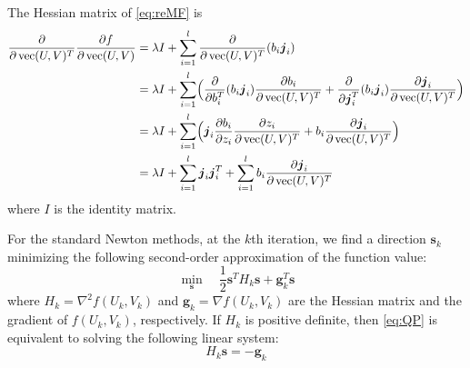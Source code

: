 \documentclass[11pt,twoside]{article}
\newcommand{\bsym}[1]{\ensuremath{\boldsymbol{#1}}}
\newcommand{\bj}{\ensuremath{\bsym{j}}}
\newcommand{\bs}{\ensuremath{\bsym{s}}}
\newcommand{\bg}{\ensuremath{\bsym{g}}}
\DeclareMathOperator*{\vectorize}{vec}
\begin{document}
The Hessian matrix of \eqref{eq:reMF} is 
\begin{align}
\pdv{\vectorize(U,V)^T} \frac{\partial f}{\partial \vectorize(U,V)}
&=\lambda I + \sum_{i=1}^{l}\pdv{\vectorize(U,V)^T} (b_i \bj_i)\nonumber\\
&=\lambda I + \sum_{i=1}^{l} \Bigl( \pdv{b_i^T} (b_i \bj_i) \frac{\partial b_i}{\partial \vectorize(U,V)^T} + \pdv{\bj_i^T} (b_i \bj_i) \frac{\partial \bj_i}{\partial \vectorize(U,V)^T} \Bigr)\nonumber\\
&=\lambda I + \sum_{i=1}^{l} \Bigl( \bj_i \frac{\partial b_i}{\partial z_i} \frac{\partial z_i}{\partial \vectorize(U,V)^T} + b_i \frac{\partial \bj_i}{\partial \vectorize(U,V)^T} \Bigr)\nonumber\\
&=\lambda I + \sum_{i=1}^{l} \bj_i \bj_i^T + \sum_{i=1}^{l} b_i \frac{\partial \bj_i}{\partial \vectorize(U,V)^T} 
\label{eq:H}
\end{align}
where $I$ is the identity matrix.

For the standard Newton methods, at the $k$th iteration, we find a direction $\bs_k$ minimizing the following second-order approximation of the function value:
\begin{equation}
    \min_{\bs} \quad \frac{1}{2}\bs^T H_k \bs + \bg_k^T \bs
\label{eq:QP}
\end{equation}
where $H_k = \nabla^2 f(U_k, V_k)$ and $\bg_k = \nabla f(U_k, V_k)$ are the Hessian matrix and the gradient of $f(U_k, V_k)$, respectively.
If $H_k$ is positive definite, then \eqref{eq:QP} is equivalent to solving the following linear system:
\begin{equation}
    H_k\bs = -\bg_k
\label{eq:HLE}
\end{equation}
\end{document}

